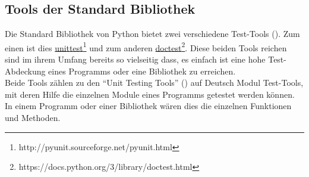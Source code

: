 \subsection{Tools der Standard Bibliothek}\label{python-tools:stdlib}

Die Standard Bibliothek von Python bietet zwei verschiedene Test-Tools (\cite{wiki.python:PythonTestingToolsTaxonomy}).
Zum einen ist dies
\href{http://pyunit.sourceforge.net/pyunit.html}{unittest}\footnote{http://pyunit.sourceforge.net/pyunit.html}
und zum anderen
\href{https://docs.python.org/3/library/doctest.html}{doctest}\footnote{https://docs.python.org/3/library/doctest.html}.
Diese beiden Tools reichen sind im ihrem Umfang bereits so vielseitig dass, es einfach ist eine hohe Test-Abdeckung eines Programms oder eine Bibliothek zu erreichen.
\newline
\\
Beide Tools zählen zu den "`Unit Testing Tools"' (\cite{wiki.python:PythonTestingToolsTaxonomy})
auf Deutsch Modul Test-Tools, mit deren Hilfe die einzelnen Module eines Programms
getestet werden können. In einem Programm oder einer Bibliothek wären dies die einzelnen
Funktionen und Methoden.



